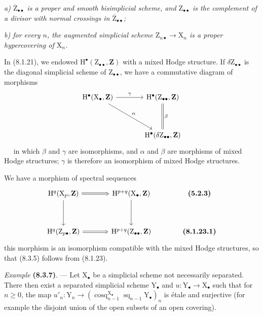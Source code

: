 \documentclass[11pt,leqno]{article}
\newcommand{\Page}[1]{\ifvmode\noindent\else\unskip\ \fi{\footnotesize\textcolor{gray}{[p.\,#1]}}\ \ignorespaces}
\begin{document}
\textit{a) \(\overline{\mathrm{Z}}_{\bullet\bullet}\) is a proper and smooth bisimplicial scheme, and \(\mathrm{Z}_{\bullet\bullet}\) is the complement of a divisor with normal crossings in \(\overline{\mathrm{Z}}_{\bullet\bullet}\);}

\textit{b) for every \(n\), the augmented simplicial scheme \(\mathrm{Z}_{n\bullet}\to\mathrm{X}_n\) is a proper hypercovering of \(\mathrm{X}_n\).}

In  (8.1.21), we endowed \(\mathrm{H}^\bullet(\mathrm{Z}_{\bullet\bullet},\mathbf{Z})\) with a mixed Hodge structure. If \(\delta\mathrm{Z}_{\bullet\bullet}\) is the diagonal simplicial scheme of \(\mathrm{Z}_{\bullet\bullet}\), we have a commutative diagram of morphisms
\[
\begin{tikzcd}[column sep=large,row sep=huge]
\mathrm{H}^\bullet(\mathrm{X}_\bullet,\mathbf{Z})
  \arrow[r,"\gamma"] \arrow[dr,"\alpha"]
 & \mathrm{H}^\bullet(\mathrm{Z}_{\bullet\bullet},\mathbf{Z})
   \arrow[d,equal,"\beta"]\\
 & \mathrm{H}^\bullet(\delta\mathrm{Z}_{\bullet\bullet},\mathbf{Z})
\end{tikzcd}
\]
\Page{43}
in which \(\beta\) and \(\gamma\) are isomorphisms, and \(\alpha\) and \(\beta\) are morphisms of mixed Hodge structures; \(\gamma\) is therefore an isomorphism of mixed Hodge structures.

We have a morphism of spectral sequences
\[
\begin{tikzcd}[column sep=large,row sep=huge]
\mathrm{H}^q(\mathrm{X}_p,\mathbf{Z})
  \arrow[r,Rightarrow] \arrow[d]
 & \mathrm{H}^{p+q}(\mathrm{X}_\bullet,\mathbf{Z}) \arrow[d]
 & \text{\textbf{(5.2.3)}}\\
\mathrm{H}^q(\mathrm{Z}_{p\bullet},\mathbf{Z})
  \arrow[r,Rightarrow]
 & \mathrm{H}^{p+q}(\mathrm{Z}_{\bullet\bullet},\mathbf{Z})
 & \text{\textbf{(8.1.23.1)}}
\end{tikzcd}
\]
this morphism is an isomorphism compatible with the mixed Hodge structures, so that (8.3.5) follows from (8.1.23).

\textit{Example} \textbf{(8.3.7)}. — Let \(\mathrm{X}_\bullet\) be a simplicial scheme not necessarily separated. There then exist a separated simplicial scheme \(\mathrm{Y}_\bullet\) and \(u:\mathrm{Y}_\bullet\to\mathrm{X}_\bullet\) such that for \(n\geq0\), the map \(u'_n:\mathrm{Y}_n\to(\operatorname{cosq}_{n-1}^{\mathrm{X}_\bullet}\operatorname{sq}_{n-1}\mathrm{Y}_\bullet)_n\) is étale and surjective (for example the disjoint union of the open subsets of an open covering).
\end{document}
